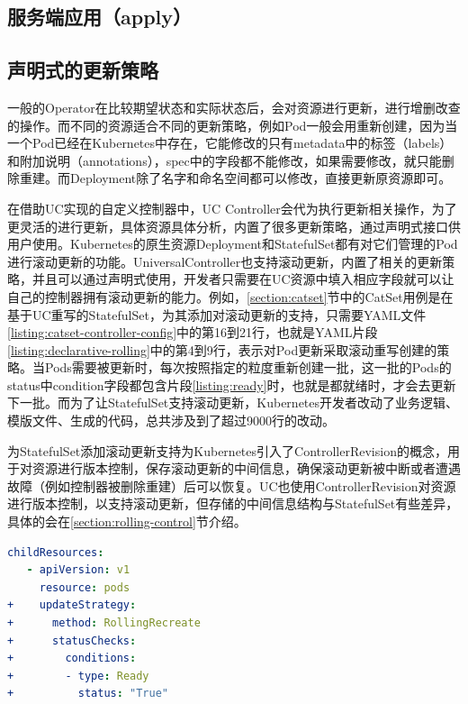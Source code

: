 \documentclass[macfonts,master]{njuthesis}
\begin{document}
\subsection{服务端应用（apply）}


\subsection{声明式的更新策略}

一般的Operator在比较期望状态和实际状态后，会对资源进行更新，进行增删改查的操作。而不同的资源适合不同的更新策略，例如Pod一般会用重新创建，因为当一个Pod已经在Kubernetes中存在，它能修改的只有metadata中的标签（labels）和附加说明（annotations），spec中的字段都不能修改，如果需要修改，就只能删除重建。而Deployment除了名字和命名空间都可以修改，直接更新原资源即可。

在借助UC实现的自定义控制器中，UC Controller会代为执行更新相关操作，为了更灵活的进行更新，具体资源具体分析，内置了很多更新策略，通过声明式接口供用户使用。Kubernetes的原生资源Deployment和StatefulSet都有对它们管理的Pod进行滚动更新的功能。UniversalController也支持滚动更新，内置了相关的更新策略，并且可以通过声明式使用，开发者只需要在UC资源中填入相应字段就可以让自己的控制器拥有滚动更新的能力。例如，\ref{section:catset}节中的CatSet用例是在基于UC重写的StatefulSet，为其添加对滚动更新的支持，只需要YAML文件\ref{listing:catset-controller-config}中的第16到21行，也就是YAML片段\ref{listing:declarative-rolling}中的第4到9行，表示对Pod更新采取滚动重写创建的策略。当Pods需要被更新时，每次按照指定的粒度重新创建一批，这一批的Pods的status中condition字段都包含片段\ref{listing:ready}时，也就是都就绪时，才会去更新下一批。而为了让StatefulSet支持滚动更新，Kubernetes开发者改动了业务逻辑、模版文件、生成的代码，总共涉及到了超过9000行的改动\cite{statefulsetupdate}。

为StatefulSet添加滚动更新支持为Kubernetes引入了ControllerRevision的概念，用于对资源进行版本控制，保存滚动更新的中间信息，确保滚动更新被中断或者遭遇故障（例如控制器被删除重建）后可以恢复。UC也使用ControllerRevision对资源进行版本控制，以支持滚动更新，但存储的中间信息结构与StatefulSet有些差异，具体的会在\ref{section:rolling-control}节介绍。
\begin{lstlisting}[language=yaml,caption=添加滚动更新,label=listing:declarative-rolling]
   childResources:
   - apiVersion: v1
     resource: pods
+    updateStrategy:
+      method: RollingRecreate
+      statusChecks:
+        conditions:
+        - type: Ready
+          status: "True"
\end{lstlisting}
\end{document}
